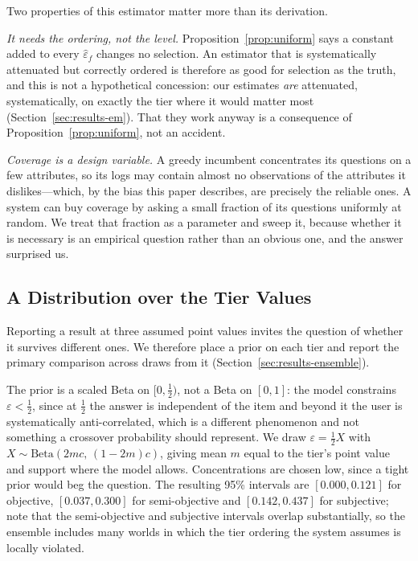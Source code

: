 Two properties of this estimator matter more than its derivation.

\emph{It needs the ordering, not the level.} Proposition~\ref{prop:uniform}
says a constant added to every $\hat\varepsilon_f$ changes no selection.
An estimator that is systematically attenuated but correctly ordered is
therefore as good for selection as the truth, and this is not a hypothetical
concession: our estimates \emph{are} attenuated, systematically, on exactly the
tier where it would matter most (Section~\ref{sec:results-em}). That they work
anyway is a consequence of Proposition~\ref{prop:uniform}, not an accident.

\emph{Coverage is a design variable.} A greedy incumbent concentrates its
questions on a few attributes, so its logs may contain almost no observations
of the attributes it dislikes---which, by the bias this paper describes, are
precisely the reliable ones. A system can buy coverage by asking a small
fraction of its questions uniformly at random. We treat that fraction as a
parameter and sweep it, because whether it is necessary is an empirical
question rather than an obvious one, and the answer surprised us.

\subsection{A Distribution over the Tier Values}
\label{sec:priors}

Reporting a result at three assumed point values invites the question of
whether it survives different ones. We therefore place a prior on each tier and
report the primary comparison across draws from it
(Section~\ref{sec:results-ensemble}).

The prior is a scaled Beta on $[0,\tfrac12)$, not a Beta on $[0,1]$: the model
constrains $\varepsilon < \tfrac12$, since at $\tfrac12$ the answer is
independent of the item and beyond it the user is systematically
anti-correlated, which is a different phenomenon and not something a crossover
probability should represent. We draw
$\varepsilon = \tfrac12 X$ with $X \sim \mathrm{Beta}(2mc,\,(1-2m)c)$, giving
mean $m$ equal to the tier's point value and support where the model allows.
Concentrations are chosen low, since a tight prior would beg the question. The
resulting 95\% intervals are $[0.000,0.121]$ for objective,
$[0.037,0.300]$ for semi-objective and $[0.142,0.437]$ for subjective; note
that the semi-objective and subjective intervals overlap substantially, so the
ensemble includes many worlds in which the tier ordering the system assumes is
locally violated.

